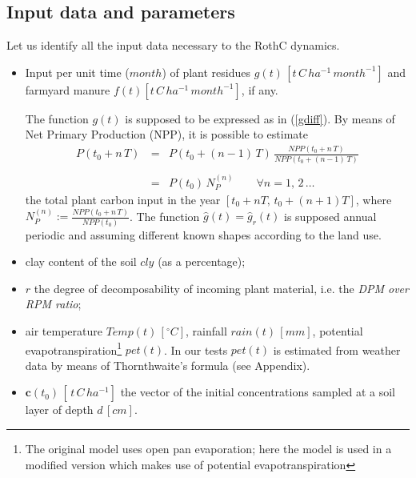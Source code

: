 \subsection{Input data and parameters} 
Let us identify all the input data necessary to the RothC dynamics. 
\begin{itemize}
    \item Input per unit time ($month$) of plant residues $g(t)\,  [ t\, C\, ha^{-1}\, month^{-1}]$ and farmyard manure $f(t) [t\, C \,ha^{-1}\, month^{-1}]$, if any.
    
    
     \noindent The function $g(t)$ is supposed to be expressed as in (\ref{gdiff}). By means of Net Primary Production (NPP), it is possible to estimate 
\begin{equation}
\begin{array}{rcl}
  P(t_0+n\,T)\,   & =&  P(t_0+(n-1)\,T)\, \displaystyle \frac{NPP(t_0+n\,T)}{NPP(t_0+(n-1)\,T)}\\ \\
     & =& P(t_0)\, N_P^{(n)} \qquad  \forall  n=1,\,2\,\dots
\end{array}
    \end{equation}
     the total plant carbon input in the  year $[t_0+nT,\, t_0+(n+1)T]$, where $ N_P^{(n)}:=\displaystyle \frac{NPP(t_0+n\,T)}{NPP(t_0)}$. The function $\hat g(t)= \hat g_r(t)$ is supposed annual periodic and assuming different known shapes according to the land use. 
    \item clay content of the soil $cly$ (as a percentage);
\item  $r$ the degree of decomposability of incoming plant material, i.e. the {\it DPM over RPM ratio};
\item   air temperature $Temp(t) \, [^\circ C]$, rainfall $rain(t)\, [mm]$,  potential evapotranspiration\footnote{The original model uses open pan evaporation; here the model is used in a  modified version which makes use of potential evapotranspiration} $pet(t)$. In our tests $pet(t)$ is estimated from weather data by means of Thornthwaite's formula (see Appendix). 
\item $\mathbf{c}(t_0)\, [ \,t\, C\, ha^{-1}]$ the vector  of the initial concentrations sampled at a soil layer of depth $d\, [cm]$.
\end{itemize}

